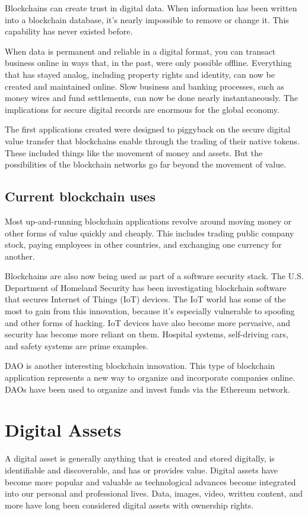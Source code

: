 \documentclass[MSE,Master,english]{twbook}%
\begin{document}
Blockchains can create trust in digital data. When information has been written into a blockchain database, it's nearly impossible to remove or change it. This capability has never existed before. 

When data is permanent and reliable in a digital format, you can transact business online in ways that, in the past, were only possible offline. Everything that has stayed analog, including property rights and identity, can now be created and maintained online. Slow business and banking processes, such as money wires and fund settlements, can now be done nearly instantaneously. The implications for secure digital records are enormous for the global economy. 

The first applications created were designed to piggyback on the secure digital value transfer that blockchains enable through the trading of their native tokens. These included things like the movement of money and assets. But the possibilities of the blockchain networks go far beyond the movement of value.

\subsection{Current blockchain uses}

Most up-and-running blockchain applications revolve around moving money or other forms of value quickly and cheaply. This includes trading public company stock, paying employees in other countries, and exchanging one currency for another. 

Blockchains are also now being used as part of a software security stack. The U.S. Department of Homeland Security has been investigating blockchain software that secures Internet of Things (IoT) devices. The IoT world has some of the most to gain from this innovation, because it's especially vulnerable to spoofing and other forms of hacking. IoT devices have also become more pervasive, and security has become more reliant on them. Hospital systems, self-driving cars, and safety systems are prime examples. 

\ac{DAO} is another interesting blockchain innovation. This type of blockchain application represents a new way to organize and incorporate companies online. DAOs have been used to organize and invest funds via the Ethereum network.

\section{Digital Assets}
A digital asset\cite{digAssets} is generally anything that is created and stored digitally, is identifiable and discoverable, and has or provides value. Digital assets have become more popular and valuable as technological advances become integrated into our personal and professional lives. Data, images, video, written content, and more have long been considered digital assets with ownership rights.
\end{document}
